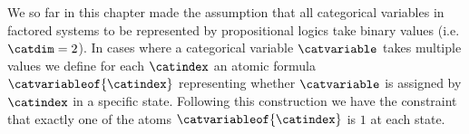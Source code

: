 %


\label{sec:categoricalTN}

We so far in this chapter made the assumption that all categorical variables in factored systems to be represented by propositional logics take binary values (i.e. $\catdim=2$).
In cases where a categorical variable $\catvariable$ takes multiple values we define for each $\catindex$ an atomic formula $\catvariableof{\catindex}$ representing whether $\catvariable$ is assigned by $\catindex$ in a specific state.
Following this construction we have the constraint that exactly one of the atoms $\catvariableof{\catindex}$ is $1$ at each state.



